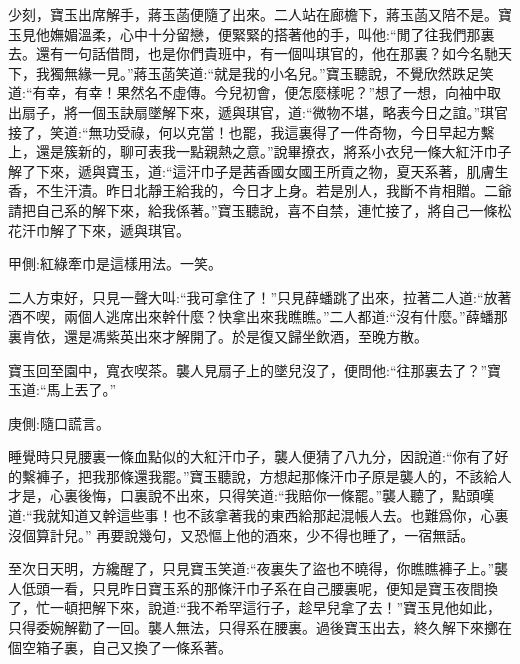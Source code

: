 \begin{parag}
    少刻，寶玉出席解手，蔣玉菡便隨了出來。二人站在廊檐下，蔣玉菡又陪不是。寶玉見他嫵媚溫柔，心中十分留戀，便緊緊的搭著他的手，叫他:“閒了往我們那裏去。還有一句話借問，也是你們貴班中，有一個叫琪官的，他在那裏？如今名馳天下，我獨無緣一見。”蔣玉菡笑道:“就是我的小名兒。”寶玉聽說，不覺欣然跌足笑道:“有幸，有幸！果然名不虛傳。今兒初會，便怎麼樣呢？”想了一想，向袖中取出扇子，將一個玉訣扇墜解下來，遞與琪官，道:“微物不堪，略表今日之誼。”琪官接了，笑道:“無功受祿，何以克當！也罷，我這裏得了一件奇物，今日早起方繫上，還是簇新的，聊可表我一點親熱之意。”說畢撩衣，將系小衣兒一條大紅汗巾子解了下來，遞與寶玉，道:“這汗巾子是茜香國女國王所貢之物，夏天系著，肌膚生香，不生汗漬。昨日北靜王給我的，今日才上身。若是別人，我斷不肯相贈。二爺請把自己系的解下來，給我係著。”寶玉聽說，喜不自禁，連忙接了，將自己一條松花汗巾解了下來，遞與琪官。\begin{note}甲側:紅綠牽巾是這樣用法。一笑。\end{note}二人方束好，只見一聲大叫:“我可拿住了！”只見薛蟠跳了出來，拉著二人道:“放著酒不喫，兩個人逃席出來幹什麼？快拿出來我瞧瞧。”二人都道:“沒有什麼。”薛蟠那裏肯依，還是馮紫英出來才解開了。於是復又歸坐飲酒，至晚方散。
\end{parag}


\begin{parag}
    寶玉回至園中，寬衣喫茶。襲人見扇子上的墜兒沒了，便問他:“往那裏去了？”寶玉道:“馬上丟了。”\begin{note}庚側:隨口謊言。\end{note}睡覺時只見腰裏一條血點似的大紅汗巾子，襲人便猜了八九分，因說道:“你有了好的繫褲子，把我那條還我罷。”寶玉聽說，方想起那條汗巾子原是襲人的，不該給人才是，心裏後悔，口裏說不出來，只得笑道:“我賠你一條罷。”襲人聽了，點頭嘆道:“我就知道又幹這些事！也不該拿著我的東西給那起混帳人去。也難爲你，心裏沒個算計兒。” 再要說幾句，又恐慪上他的酒來，少不得也睡了，一宿無話。
\end{parag}


\begin{parag}
    至次日天明，方纔醒了，只見寶玉笑道:“夜裏失了盜也不曉得，你瞧瞧褲子上。”襲人低頭一看，只見昨日寶玉系的那條汗巾子系在自己腰裏呢，便知是寶玉夜間換了，忙一頓把解下來，說道:“我不希罕這行子，趁早兒拿了去！”寶玉見他如此，只得委婉解勸了一回。襲人無法，只得系在腰裏。過後寶玉出去，終久解下來擲在個空箱子裏，自己又換了一條系著。
\end{parag}


